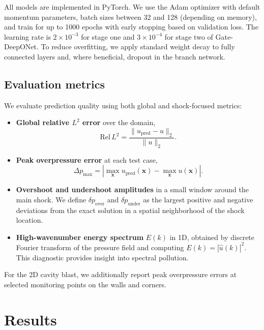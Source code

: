 \documentclass[a4paper,fleqn]{cas-dc}
\begin{document}
All models are implemented in PyTorch.
We use the Adam optimizer with default momentum parameters, batch sizes between 32 and 128 (depending on memory), and train for up to 1000 epochs with early stopping based on validation loss.
The learning rate is $2\times10^{-3}$ for stage one and $3\times10^{-4}$ for stage two of Gate-DeepONet.
To reduce overfitting, we apply standard weight decay to fully connected layers and, where beneficial, dropout in the branch network.

\subsection{Evaluation metrics}

We evaluate prediction quality using both global and shock-focused metrics:

\begin{itemize}[leftmargin=*]
  \item \textbf{Global relative $L^2$ error} over the domain,
  \begin{equation}
    \mathrm{Rel}\,L^2
    = \frac{\|u_{\mathrm{pred}}-u\|_2}{\|u\|_2}.
  \end{equation}
  \item \textbf{Peak overpressure error} at each test case,
  \begin{equation}
    \Delta p_{\max}
    = \left| \max_{\mathbf{x}}u_{\mathrm{pred}}(\mathbf{x}) -
              \max_{\mathbf{x}}u(\mathbf{x}) \right|.
  \end{equation}
  \item \textbf{Overshoot and undershoot amplitudes} in a small window around the main shock.
  We define $\delta p_{\mathrm{over}}$ and $\delta p_{\mathrm{under}}$ as the largest positive and negative deviations from the exact solution in a spatial neighborhood of the shock location.
  \item \textbf{High-wavenumber energy spectrum} $E(k)$ in 1D, obtained by discrete Fourier transform of the pressure field and computing $E(k)=|\hat{u}(k)|^2$.
  This diagnostic provides insight into spectral pollution.
\end{itemize}

For the 2D cavity blast, we additionally report peak overpressure errors at selected monitoring points on the walls and corners.

\section{Results}
\label{sec:results}
\end{document}
